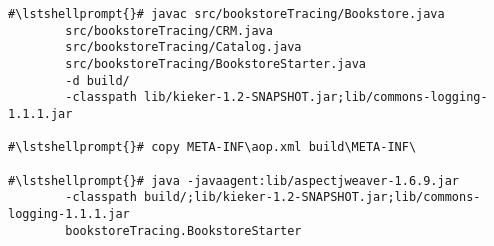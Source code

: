 \begin{lstlisting}[caption=Command to compile and run the annotated Bookstore under Windows]
#\lstshellprompt{}# javac src/bookstoreTracing/Bookstore.java 
        src/bookstoreTracing/CRM.java 
        src/bookstoreTracing/Catalog.java 
        src/bookstoreTracing/BookstoreStarter.java 
        -d build/ 
        -classpath lib/kieker-1.2-SNAPSHOT.jar;lib/commons-logging-1.1.1.jar

#\lstshellprompt{}# copy META-INF\aop.xml build\META-INF\

#\lstshellprompt{}# java -javaagent:lib/aspectjweaver-1.6.9.jar 
        -classpath build/;lib/kieker-1.2-SNAPSHOT.jar;lib/commons-logging-1.1.1.jar 
        bookstoreTracing.BookstoreStarter
\end{lstlisting}
